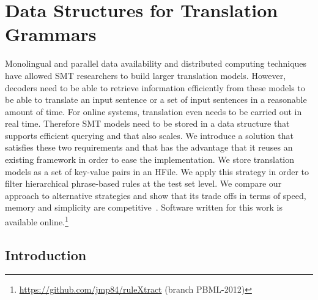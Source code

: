 \chapter{Data Structures for Translation Grammars}
\label{chap:hfile}


Monolingual and parallel data availability and distributed computing techniques
have allowed SMT
researchers to build larger translation models. However, decoders need to be
able to retrieve information efficiently from these models to be able to
translate an input sentence or a set of input sentences in a reasonable amount
of time. For online systems, translation even needs to be carried out in
real time. Therefore SMT models need to be stored in a data structure
that supports efficient querying and that also scales. We introduce a solution
that satisfies these two requirements and that has the advantage that
it reuses an existing framework in order to ease the implementation.
We store translation models as a set of key-value pairs in an HFile. We apply this
strategy in order to filter hierarchical phrase-based rules at the test set level. We compare our
approach to alternative strategies and show that its trade offs in terms
of speed, memory and simplicity are
competitive~\citep{pino-waite-byrne:2012:PBML}. Software written for this work
is available online.\footnote{\url{https://github.com/jmp84/ruleXtract} (branch PBML-2012)}

\section{Introduction}
\label{sec:hfileIntro}

